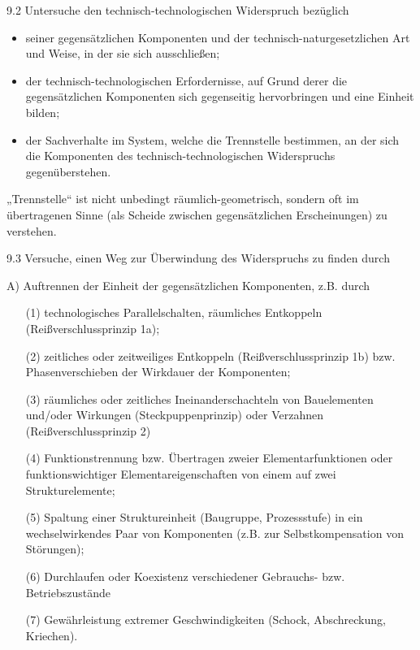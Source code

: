 \documentclass[12pt,a4paper]{article}
\begin{document}
9.2  Untersuche den technisch-technologischen Widerspruch bezüglich
\begin{itemize}
  \item seiner gegensätzlichen Komponenten und der technisch-naturgesetzlichen
    Art und Weise, in der sie sich ausschließen;
  \item der technisch-technologischen Erfordernisse, auf Grund derer die
    gegensätzlichen Komponenten sich gegenseitig hervorbringen und eine Einheit
    bilden;
  \item der Sachverhalte im System, welche die Trennstelle bestimmen, an der
    sich die Komponenten des technisch-technologischen Widerspruchs
    gegenüberstehen.
\end{itemize}
„Trennstelle“ ist nicht unbedingt räumlich-geometrisch, sondern oft im
übertragenen Sinne (als Scheide zwischen gegensätzlichen Erscheinungen) zu
verstehen.

9.3  Versuche, einen Weg zur Überwindung des Widerspruchs zu finden durch

A) Auftrennen der Einheit der gegensätzlichen Komponenten, z.B. durch
\begin{itemize}
\item [(1)] technologisches Parallelschalten, räumliches Entkoppeln
  (Reißverschlussprinzip 1a);
\item [(2)] zeitliches oder zeitweiliges Entkoppeln (Reißverschlussprinzip 1b)
  bzw. Phasenverschieben der Wirkdauer der Komponenten;
\item [(3)] räumliches oder zeitliches Ineinanderschachteln von Bauelementen
  und/oder Wirkungen (Steckpuppenprinzip) oder Verzahnen (Reißverschlussprinzip
  2)
\item [(4)] Funktionstrennung bzw. Übertragen zweier Elementarfunktionen oder
  funktionswichtiger Elementareigenschaften von einem auf zwei
  Strukturelemente;
\item [(5)] Spaltung einer Struktureinheit (Baugruppe, Prozessstufe) in ein
  wechselwirkendes Paar von Komponenten (z.B. zur Selbstkompensation von
  Störungen);
\item [(6)] Durchlaufen oder Koexistenz verschiedener Gebrauchs- bzw.
  Betriebszustände
\item [(7)] Gewährleistung extremer Geschwindigkeiten (Schock, Abschreckung,
  Kriechen).
\end{itemize}
\end{document}
